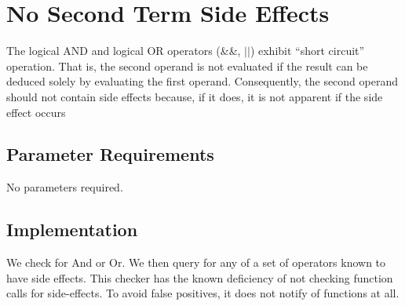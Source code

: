 %
%

\section{No Second Term Side Effects}
\label{NoSecondTermSideEffects::overview}
The logical AND and logical OR operators (\&\&, $||$) exhibit ``short
circuit'' operation. That is, the second operand is not evaluated if
the result can be deduced solely by evaluating the first
operand. Consequently, the second operand should not contain side
effects because, if it does, it is not apparent if the side effect occurs

\subsection{Parameter Requirements}

 No parameters required.

\subsection{Implementation}

We check for And or Or.  We then query for any of a set of operators
known to have side effects.  This checker has the known deficiency of
not checking function calls for side-effects.  To avoid false
positives, it does not notify of functions at all.  

